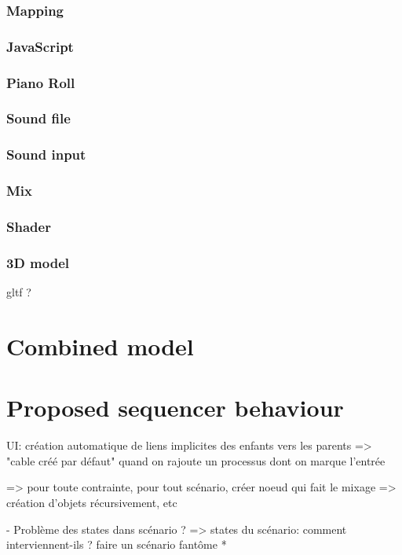 \documentclass[applsci,article,submit,moreauthors,pdftex,10pt,a4paper]{mdpi}
\begin{document}
\subsubsection{Mapping}
\subsubsection{JavaScript}
\subsubsection{Piano Roll}
\subsubsection{Sound file}
\subsubsection{Sound input}
\subsubsection{Mix}

\subsubsection{Shader}
\subsubsection{3D model}
gltf ? 

\section{Combined model}
\subsection{}

\section{Proposed sequencer behaviour}
UI: création automatique de liens implicites des enfants vers les parents
=> "cable créé par défaut" quand on rajoute un processus dont on marque l'entrée

=> pour toute contrainte, pour tout scénario, créer noeud qui fait le mixage
=> création d'objets récursivement, etc

- Problème des states dans scénario ?
=> states du scénario: comment interviennent-ils ? faire un scénario fantôme *
\end{document}

